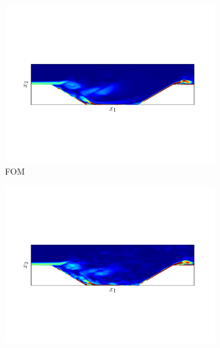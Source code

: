 \begin{figure}
\begin{center}
\begin{subfigure}[t]{0.95\textwidth}
\includegraphics[trim={0cm 3.9cm 0cm 3.9cm},clip,width=1.\linewidth]{figs/cavity/u_fom_t5_basis2.pdf}
\caption{FOM} 
\end{subfigure}
\begin{subfigure}[t]{0.95\textwidth}
\includegraphics[trim={0cm 3.9cm 0cm 3.9cm},clip,width=1.\linewidth]{figs/cavity/u_lspg_t5_basis2.pdf}

\end{subfigure}
\end{center}
\end{figure}
